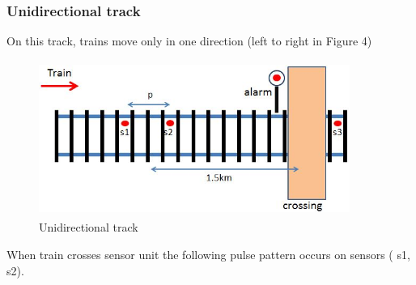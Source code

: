 \documentclass[aps,letterpaper,11pt]{article}
\begin{document}
\subsubsection{Unidirectional track}
On this track, trains move only in one direction (left to right in Figure 4)
\begin{figure}[H]
\begin{center}
\includegraphics[height = 2in,width=4in,angle=00]{figures/oneWayTrack.JPG}
\caption{\small Unidirectional track}
\end{center}
\end{figure}
When train crosses sensor unit the following pulse pattern occurs on sensors (
s1, s2).
\end{document}
